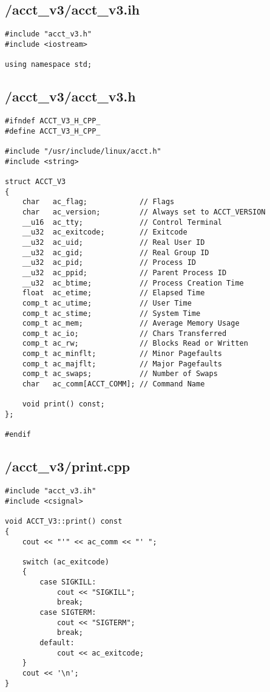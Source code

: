 \documentclass{article}
\begin{document}
\subsection*{/acct\_v3/acct\_v3.ih}
\begin{verbatim}
#include "acct_v3.h"
#include <iostream>

using namespace std;

\end{verbatim}
\subsection*{/acct\_v3/acct\_v3.h}
\begin{verbatim}
#ifndef ACCT_V3_H_CPP_
#define ACCT_V3_H_CPP_

#include "/usr/include/linux/acct.h"
#include <string>

struct ACCT_V3
{
    char   ac_flag;            // Flags
    char   ac_version;         // Always set to ACCT_VERSION
    __u16  ac_tty;             // Control Terminal
    __u32  ac_exitcode;        // Exitcode
    __u32  ac_uid;             // Real User ID
    __u32  ac_gid;             // Real Group ID
    __u32  ac_pid;             // Process ID
    __u32  ac_ppid;            // Parent Process ID
    __u32  ac_btime;           // Process Creation Time
    float  ac_etime;           // Elapsed Time
    comp_t ac_utime;           // User Time
    comp_t ac_stime;           // System Time
    comp_t ac_mem;             // Average Memory Usage
    comp_t ac_io;              // Chars Transferred
    comp_t ac_rw;              // Blocks Read or Written
    comp_t ac_minflt;          // Minor Pagefaults
    comp_t ac_majflt;          // Major Pagefaults
    comp_t ac_swaps;           // Number of Swaps
    char   ac_comm[ACCT_COMM]; // Command Name

    void print() const;
};

#endif

\end{verbatim}
\subsection*{/acct\_v3/print.cpp}
\begin{verbatim}
#include "acct_v3.ih"
#include <csignal>

void ACCT_V3::print() const
{
    cout << "'" << ac_comm << "' ";

    switch (ac_exitcode)
    {
        case SIGKILL:
            cout << "SIGKILL";
            break;
        case SIGTERM:
            cout << "SIGTERM";
            break;
        default:
            cout << ac_exitcode;
    }
    cout << '\n';
}
\end{verbatim}
\end{document}
